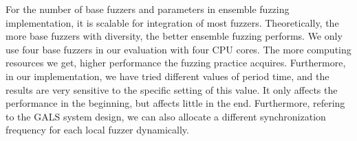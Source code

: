 For the number of base fuzzers and parameters in ensemble fuzzing implementation, it is scalable for integration of most fuzzers. Theoretically, the more base fuzzers with diversity, the better ensemble fuzzing performs. We only use four base fuzzers in our evaluation with four CPU cores. The more computing resources we get, higher performance the fuzzing practice acquires. %
Furthermore, in our implementation, 
we have tried different values of period time, and the results are very sensitive to the specific setting of this value. It only affects the performance in the beginning, but affects little in the end.
Furthermore, refering to the GALS system design, we can also allocate a different synchronization frequency for each local fuzzer dynamically. %


